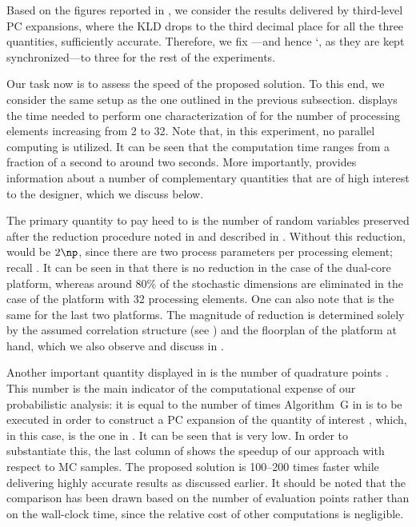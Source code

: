 Based on the figures reported in , we consider
the results delivered by third-level \ac{PC} expansions, where the \ac{KLD}
drops to the third decimal place for all the three quantities, sufficiently
accurate. Therefore, we fix \lc---and hence \lq, as they are kept
synchronized---to three for the rest of the experiments.


Our task now is to assess the speed of the proposed solution. To this end, we
consider the same setup as the one outlined in the previous subsection.
 displays the time needed to perform one
characterization of \vg for the number of processing elements \np increasing
from 2 to 32. Note that, in this experiment, no parallel computing is utilized.
It can be seen that the computation time ranges from a fraction of a second to
around two seconds. More importantly,  provides
information about a number of complementary quantities that are of high interest
to the designer, which we discuss below.

The primary quantity to pay heed to is the number of random variables \nz
preserved after the reduction procedure noted in  and
described in . Without this reduction, \nz
would be $2 \np$, since there are two process parameters per processing element;
recall . It can be seen in
 that there is no reduction in the case of the
dual-core platform, whereas around 80\% of the stochastic dimensions are
eliminated in the case of the platform with 32 processing elements. One can also
note that \nz is the same for the last two platforms. The magnitude of reduction
is determined solely by the assumed correlation structure (see
) and the floorplan of the platform at
hand, which we also observe and discuss in .

Another important quantity displayed in  is the
number of quadrature points \nq. This number is the main indicator of the
computational expense of our probabilistic analysis: it is equal to the number
of times Algorithm~G in  is to be executed in order to
construct a \ac{PC} expansion of the quantity of interest \g, which, in this
case, is the one in . It can be seen that \nq
is very low. In order to substantiate this, the last column of
 shows the speedup of our approach with respect
to  \ac{MC} samples. The proposed solution is 100--200 times faster
while delivering highly accurate results as discussed earlier. It should be
noted that the comparison has been drawn based on the number of evaluation
points rather than on the wall-clock time, since the relative cost of other
computations is negligible.


